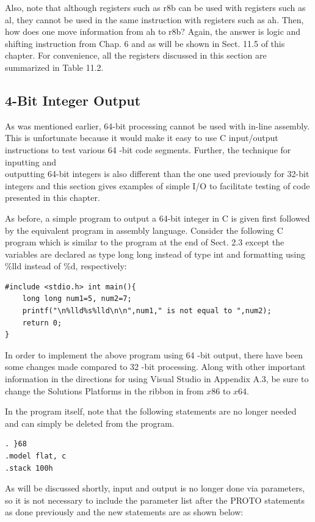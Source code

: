 \documentclass[10pt]{article}
\begin{document}
Also, note that although registers such as r8b can be used with registers such as al, they cannot be used in the same instruction with registers such as ah. Then, how does one move information from ah to r8b? Again, the answer is logic and shifting instruction from Chap. 6 and as will be shown in Sect. 11.5 of this chapter. For convenience, all the registers discussed in this section are summarized in Table 11.2.

\subsection*{4-Bit Integer Output}
As was mentioned earlier, 64-bit processing cannot be used with in-line assembly. This is unfortunate because it would make it easy to use C input/output instructions to test various 64 -bit code segments. Further, the technique for inputting and\\
outputting 64-bit integers is also different than the one used previously for 32-bit integers and this section gives examples of simple I/O to facilitate testing of code presented in this chapter.

As before, a simple program to output a 64-bit integer in C is given first followed by the equivalent program in assembly language. Consider the following C program which is similar to the program at the end of Sect. 2.3 except the variables are declared as type long long instead of type int and formatting using \%lld instead of \%d, respectively:

\begin{verbatim}
#include <stdio.h> int main(){
    long long num1=5, num2=7;
    printf("\n%lld%s%lld\n\n",num1," is not equal to ",num2);
    return 0;
}
\end{verbatim}

In order to implement the above program using 64 -bit output, there have been some changes made compared to 32 -bit processing. Along with other important information in the directions for using Visual Studio in Appendix A.3, be sure to change the Solutions Platforms in the ribbon in from $x 86$ to $x 64$.

In the program itself, note that the following statements are no longer needed and can simply be deleted from the program.

\begin{verbatim}
. }68
.model flat, c
.stack 100h
\end{verbatim}

As will be discussed shortly, input and output is no longer done via parameters, so it is not necessary to include the parameter list after the PROTO statements as done previously and the new statements are as shown below:
\end{document}
